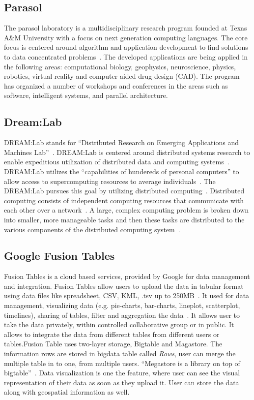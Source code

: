 \subsection{Parasol}

The parasol laboratory is a multidisciplinary research program founded
at Texas A\&M University with a focus on next generation computing
languages.  The core focus is centered around algorithm and
application development to find solutions to data concentrated
problems~\cite{www-parasol}. The developed applications are being
applied in the following areas: computational biology, geophysics,
neuroscience, physics, robotics, virtual reality and computer aided
drug design (CAD).  The program has organized a number of workshops
and conferences in the areas such as software, intelligent systems,
and parallel architecture.
    
\subsection{Dream:Lab}

DREAM:Lab stands for ``Distributed Research on Emerging Applications
and Machines Lab''~\cite{dream}. DREAM:Lab is centered around
distributed systems research to enable expeditious utilization of
distributed data and computing systems~\cite{dream}. DREAM:Lab
utilizes the ``capabilities of hundereds of personal computers'' to
allow access to supercomputing resources to average
individuals~\cite{rao}. The DREAM:Lab pursues this goal by utilizing
distributed computing~\cite{rao}.  Distributed computing consists of
independent computing resources that communicate with each other over
a network~\cite{denero}. A large, complex computing problem is broken
down into smaller, more manageable tasks and then these tasks are
distributed to the various components of the distributed computing
system~\cite{denero}.

    \pv
    
\subsection{Google Fusion Tables}
    
Fusion Tables is a cloud based services, provided by Google for data
management and integration. Fusion Tables allow users to upload the
data in tabular format using data files like spreadsheet, CSV, KML,
.tsv up to 250MB~\cite{www-FusionTableSupport}. It used for data
management, visualizing data (e.g. pie-charts, bar-charts, lineplot,
scatterplot, timelines), sharing of tables, filter and aggregation the
data~\cite{wiki-FusionTable}.  It allows user to take the data
privately, within controlled collaborative group or in public. It
allows to integrate the data from different tables from different
users or tables.Fusion Table uses two-layer storage, Bigtable and
Magastore. The information rows are stored in bigdata table called
\textit{Rows}, user can merge the multiple table in to one, from multiple
users. ``Megastore is a library on top of
bigtable''~\cite{GoogleFusionTable2012}. Data visualization is one the
feature, where user can see the visual representation of their data as
soon as they upload it. User can store the data along with geospatial
information as well.

